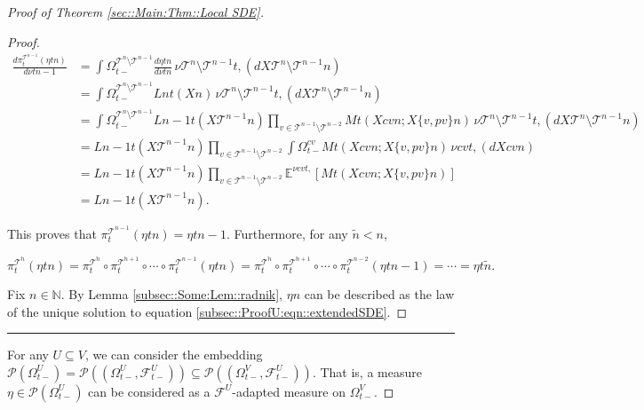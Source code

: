 \documentclass[12pt]{article}
\newcommand{\mb}{\mathbb}
\newcommand{\mc}{\mathcal}
\newcommand{\ind}{\hspace{24pt}}
\newcommand{\lin}{\rule{\linewidth}{0.4 pt}}
\newcommand{\exmu}[2]{\mb{E}^{#1}\left[#2\right]}	%
\newcommand{\pmsr}{\mc{P}}							%
\renewcommand{\v}{v}							%
\renewcommand{\U}{U}							%
\renewcommand{\t}{t}							%
\newcommand{\sset}{\Omega}						%
\newcommand{\proj}{\pi}							%
\newcommand{\F}{\mc{F}}							%
\newcommand{\X}{X}								%
\newcommand{\vsi}[1]{^{#1}}						%
\newcommand{\ts}[1]{_{#1}}						%
\newcommand{\tree}{\mc{T}}						%
\newcommand{\sln}[1]{^{#1}}						%
\newcommand{\alt}[1]{\widetilde{#1}}			%
\newcommand{\mm}{\nu}							%
\newcommand{\mmm}{\eta}							%
\newcommand{\dense}{L}							%
\newcommand{\cdense}{M}							%
\renewcommand{\c}{c}							%
\newcommand{\p}{p}								%
\begin{document}
\begin{proof}[Proof of Theorem \ref{sec::Main:Thm::Local SDE}]
\begin{proof}
\begin{align*}
\frac{d\proj\vsi{\tree\sln{n-1}}\ts{\t}(\mmm{}{\t}{n})}{d\mm{}{\t}{n-1}} &= \int{\sset\vsi{\tree\sln{n}\setminus\tree\sln{n-1}}\ts{\t-}} \frac{d\mmm{}{\t}{n}}{d\mm{}{\t}{n}}\,\mm{\tree\sln{n}\setminus\tree\sln{n-1}}{\t,}{}(d\X{\tree\sln{n}\setminus\tree\sln{n-1}}{}{n})\\
&=\int{\sset\vsi{\tree\sln{n}\setminus\tree\sln{n-1}}\ts{\t-}} \dense{n}{\t}(\X{}{}{n})\,\mm{\tree\sln{n}\setminus\tree\sln{n-1}}{\t,}{}(d\X{\tree\sln{n}\setminus\tree\sln{n-1}}{}{n})\\
&= \int{\sset\vsi{\tree\sln{n}\setminus\tree\sln{n-1}}\ts{\t-}} \dense{n-1}{\t}(\X{\tree\sln{n-1}}{}{n})\prod_{\v\in \tree\sln{n-1}\setminus\tree\sln{n-2}} \cdense{}{\t}(\X{\c{\v}}{}{n};\X{\{v,\p{\v}\}}{}{n})\,\mm{\tree\sln{n}\setminus\tree\sln{n-1}}{\t,}{}(d\X{\tree\sln{n}\setminus\tree\sln{n-1}}{}{n})\\
&= \dense{n-1}{\t}(\X{\tree\sln{n-1}}{}{n})\prod_{\v\in \tree\sln{n-1}\setminus\tree\sln{n-2}}\int{\sset\vsi{\c{\v}}\ts{\t-}} \cdense{}{\t}(\X{\c{\v}}{}{n};\X{\{v,\p{\v}\}}{}{n})\,\mm{\c{\v}}{\t,}{}(d\X{\c{\v}}{}{n})\\
&= \dense{n-1}{\t}(\X{\tree\sln{n-1}}{}{n})\prod_{\v\in \tree\sln{n-1}\setminus\tree\sln{n-2}}\exmu{\mm{\c{\v}}{\t,}{}}{\cdense{}{\t}(\X{\c{\v}}{}{n};\X{\{v,\p{\v}\}}{}{n})}\\
&= \dense{n-1}{\t}(\X{\tree\sln{n-1}}{}{n}).
\end{align*}

This proves that \(\proj\vsi{\tree\sln{n-1}}\ts{\t}(\mmm{}{\t}{n}) = \mmm{}{\t}{n-1}\). Furthermore, for any \(\alt{n} < n\),

\[\proj\vsi{\tree\sln{\alt{n}}}\ts{\t}(\mmm{}{\t}{n}) = \proj\vsi{\tree\sln{\alt{n}}}\ts{\t}\circ\proj\vsi{\tree\sln{\alt{n} + 1}}\ts{\t} \circ\cdots\circ \proj\vsi{\tree\sln{n-1}}\ts{\t}(\mmm{}{\t}{n}) = \proj\vsi{\tree\sln{\alt{n}}}\ts{\t}\circ\proj\vsi{\tree\sln{\alt{n} + 1}}\ts{\t} \circ\cdots\circ \proj\vsi{\tree\sln{n-2}}\ts{\t}(\mmm{}{\t}{n-1}) = \cdots = \mmm{}{\t}{\alt{n}}.\]

\ind Fix \(n\in\mb{N}\). By Lemma \ref{subsec::Some:Lem::radnik}, \(\mmm{}{}{n}\) can be described as the law of the unique solution to equation \eqref{subsec::ProofU:eqn::extendedSDE}.
\end{proof}

\lin

For any \(\U\subseteq V\), we can consider the embedding \(\pmsr\left(\sset\vsi{\U}\ts{\t-}\right) = \pmsr\left((\sset\vsi{\U}\ts{\t-},\F\vsi{\U}\ts{\t-})\right) \subseteq \pmsr\left((\sset\vsi{V}\ts{\t-},\F\vsi{\U}\ts{\t-})\right)\). That is, a measure \(\mmm{}{}{}\in \pmsr\left(\sset\vsi{\U}\ts{\t-}\right)\) can be considered as a \(\F\vsi{\U}\ts{}\)-adapted measure on \(\sset\vsi{V}\ts{\t-}\).


\end{proof}
\end{document}
